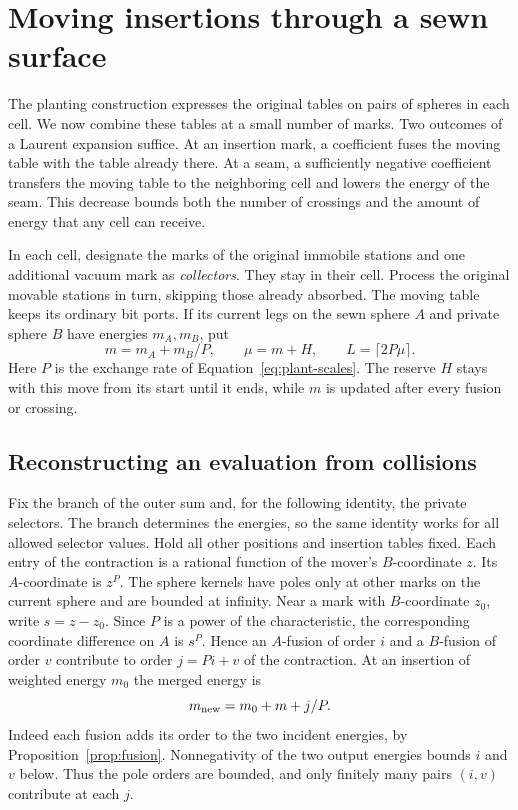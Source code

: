 \section{Moving insertions through a sewn surface}\label{subsec:motion}

The planting construction expresses the original tables on pairs of
spheres in each cell. We now combine these tables at a small number
of marks. Two outcomes of a Laurent expansion suffice. At an insertion
mark, a coefficient fuses the moving table with the table already
there. At a seam, a sufficiently negative coefficient transfers the
moving table to the neighboring cell and lowers the energy of the
seam. This decrease bounds both the number of crossings and the amount
of energy that any cell can receive.

In each cell, designate the marks of the original immobile stations
and one additional vacuum mark as \emph{collectors}. They stay in their
cell. Process the original movable stations in turn, skipping those
already absorbed. The moving table keeps its ordinary bit ports. If its
current legs on the sewn sphere $A$ and private sphere $B$ have
energies $m_A,m_B$, put
\[
       m=m_A+m_B/P,\qquad \mu=m+H,\qquad L=\lceil 2P\mu\rceil .
\]
Here $P$ is the exchange rate of Equation~\eqref{eq:plant-scales}.
The reserve $H$ stays with this move from its start until it ends, while
$m$ is updated after every fusion or crossing.

\subsection{Reconstructing an evaluation from collisions}

Fix the branch of the outer sum and, for the following identity, the
private selectors. The branch determines the energies, so the same
identity works for all allowed selector values. Hold all other positions
and insertion tables fixed. Each entry of the contraction is a rational
function of the mover's $B$-coordinate $z$. Its $A$-coordinate is $z^P$.
The sphere kernels have poles only at other marks on the current sphere
and are bounded at infinity. Near a mark with $B$-coordinate $z_0$, write
$s=z-z_0$. Since $P$ is a power of the characteristic, the corresponding
coordinate difference on $A$ is $s^P$. Hence an $A$-fusion of order $i$
and a $B$-fusion of order $v$ contribute to order $j=Pi+v$ of the
contraction. At an insertion of weighted energy $m_0$ the merged energy is
\begin{equation}
            m_{\rm new}=m_0+m+j/P.                     \label{eq:motion-fusion}
\end{equation}
Indeed each fusion adds its order to the two incident energies, by
Proposition~\ref{prop:fusion}. Nonnegativity of the two output energies
bounds $i$ and $v$ below. Thus the pole orders are bounded, and only
finitely many pairs $(i,v)$ contribute at each $j$.

